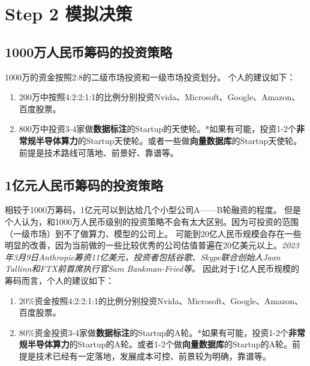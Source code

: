 \section{Step 2 模拟决策}
\subsection{1000万人民币筹码的投资策略}
1000万的资金按照2:8的二级市场投资和一级市场投资划分。
个人的建议如下：
\begin{enumerate}
    \item 200万中按照4:2:2:1:1的比例分别投资Nvida、Microsoft、Google、Amazon、百度股票。
    \item 800万中投资3-4家做\textbf{数据标注}的Startup的天使轮。*如果有可能，投资1-2个\textbf{非常规半导体算力}的Startup天使轮。或者一些做\textbf{向量数据库}的Startup天使轮。前提是技术路线可落地、前景好、靠谱等。
\end{enumerate}

\subsection{1亿元人民币筹码的投资策略}
相较于1000万筹码，1亿元可以到达给几个小型公司A——B轮融资的程度。
但是个人认为，和1000万人民币级别的投资策略不会有太大区别。因为可投资的范围（一级市场）到不了做算力、模型的公司上。
可能到20亿人民币规模会存在一些明显的改善，因为当前做的一些比较优秀的公司估值普遍在20亿美元以上。\textit{2023年3月9日Anthropic筹资11亿美元，投资者包括谷歌、Skype联合创始人Jaan Tallinn和FTX前首席执行官Sam Bankman-Fried等。}
因此对于1亿人民币规模的筹码而言，个人的建议如下：
\begin{enumerate}
    \item 20\%资金按照4:2:2:1:1的比例分别投资Nvida、Microsoft、Google、Amazon、百度股票。
    \item 80\%资金投资3-4家做\textbf{数据标注}的Startup的A轮。*如果有可能，投资1-2个\textbf{非常规半导体算力}的Startup的A轮。或者1-2个做\textbf{向量数据库}的Startup的A轮。前提是技术已经有一定落地，发展成本可控、前景较为明确，靠谱等。
\end{enumerate}













